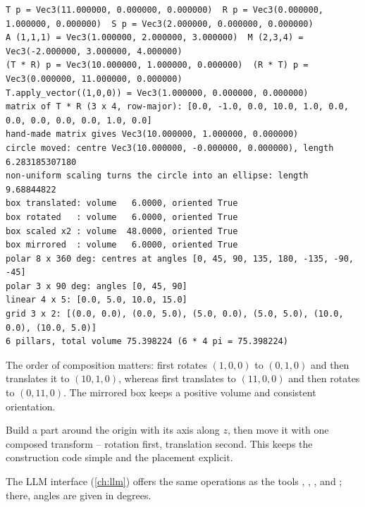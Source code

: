 \begin{lstlisting}[style=text]
T p = Vec3(11.000000, 0.000000, 0.000000)  R p = Vec3(0.000000, 1.000000, 0.000000)  S p = Vec3(2.000000, 0.000000, 0.000000)
A (1,1,1) = Vec3(1.000000, 2.000000, 3.000000)  M (2,3,4) = Vec3(-2.000000, 3.000000, 4.000000)
(T * R) p = Vec3(10.000000, 1.000000, 0.000000)  (R * T) p = Vec3(0.000000, 11.000000, 0.000000)
T.apply_vector((1,0,0)) = Vec3(1.000000, 0.000000, 0.000000)
matrix of T * R (3 x 4, row-major): [0.0, -1.0, 0.0, 10.0, 1.0, 0.0, 0.0, 0.0, 0.0, 0.0, 1.0, 0.0]
hand-made matrix gives Vec3(10.000000, 1.000000, 0.000000)
circle moved: centre Vec3(10.000000, -0.000000, 0.000000), length 6.283185307180
non-uniform scaling turns the circle into an ellipse: length 9.68844822
box translated: volume   6.0000, oriented True
box rotated   : volume   6.0000, oriented True
box scaled x2 : volume  48.0000, oriented True
box mirrored  : volume   6.0000, oriented True
polar 8 x 360 deg: centres at angles [0, 45, 90, 135, 180, -135, -90, -45]
polar 3 x 90 deg: angles [0, 45, 90]
linear 4 x 5: [0.0, 5.0, 10.0, 15.0]
grid 3 x 2: [(0.0, 0.0), (0.0, 5.0), (5.0, 0.0), (5.0, 5.0), (10.0, 0.0), (10.0, 5.0)]
6 pillars, total volume 75.398224 (6 * 4 pi = 75.398224)
\end{lstlisting}

The order of composition matters:  first rotates $(1,0,0)$ to $(0,1,0)$ and then
translates it to $(10,1,0)$, whereas  first translates to $(11,0,0)$ and then
rotates to $(0,11,0)$. The mirrored box keeps a positive volume and consistent orientation.

\begin{tip}
Build a part around the origin with its axis along $z$, then move it with one composed transform
 -- rotation
first, translation second. This keeps the construction code simple and the placement explicit.
\end{tip}

\begin{note}
The LLM interface (\cref{ch:llm}) offers the same operations as the tools
, , ,  and
; there, angles are given in degrees.
\end{note}
